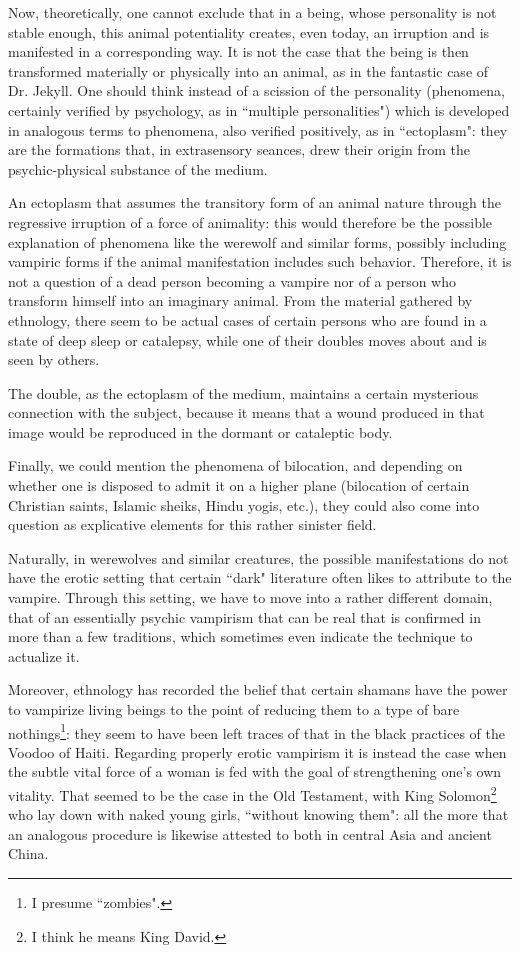 Now, theoretically, one cannot exclude that in a being, whose personality is not stable enough, this animal potentiality creates, even today, an irruption and is manifested in a corresponding way. It is not the case that the being is then transformed materially or physically into an animal, as in the fantastic case of Dr. Jekyll. One should think instead of a scission of the personality (phenomena, certainly verified by psychology, as in ``multiple personalities") which is developed in analogous terms to phenomena, also verified positively, as in ``ectoplasm": they are the formations that, in extrasensory seances, drew their origin from the psychic-physical substance of the medium.

An ectoplasm that assumes the transitory form of an animal nature through the regressive irruption of a force of animality: this would therefore be the possible explanation of phenomena like the werewolf and similar forms, possibly including vampiric forms if the animal manifestation includes such behavior. Therefore, it is not a question of a dead person becoming a vampire nor of a person who transform himself into an imaginary animal. From the material gathered by ethnology, there seem to be actual cases of certain persons who are found in a state of deep sleep or catalepsy, while one of their doubles moves about and is seen by others.

The double, as the ectoplasm of the medium, maintains a certain mysterious connection with the subject, because it means that a wound produced in that image would be reproduced in the dormant or cataleptic body.

Finally, we could mention the phenomena of bilocation, and depending on whether one is disposed to admit it on a higher plane (bilocation of certain Christian saints, Islamic sheiks, Hindu yogis, etc.), they could also come into question as explicative elements for this rather sinister field.

Naturally, in werewolves and similar creatures, the possible manifestations do not have the erotic setting that certain ``dark" literature often likes to attribute to the vampire. Through this setting, we have to move into a rather different domain, that of an essentially psychic vampirism that can be real that is confirmed in more than a few traditions, which sometimes even indicate the technique to actualize it.

Moreover, ethnology has recorded the belief that certain shamans have the power to vampirize living beings to the point of reducing them to a type of bare nothings\footnote{I presume ``zombies".}: they seem to have been left traces of that in the black practices of the Voodoo of Haiti. Regarding properly erotic vampirism it is instead the case when the subtle vital force of a woman is fed with the goal of strengthening one's own vitality. That seemed to be the case in the Old Testament, with King Solomon\footnote{I think he means King David.} who lay down with naked young girls, ``without knowing them": all the more that an analogous procedure is likewise attested to both in central Asia and ancient China.

